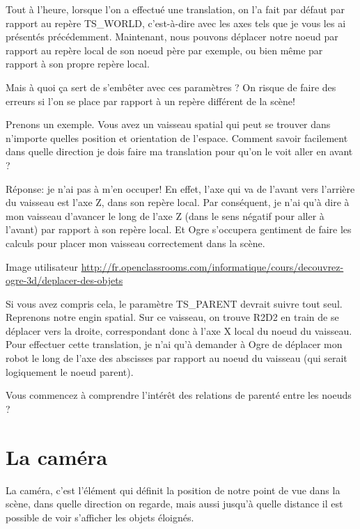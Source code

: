 Tout \`{a} l'heure, lorsque l'on a effectu\'e une translation, on l'a fait par d\'efaut par rapport au rep\`ere TS\_WORLD, c'est-\`{a}-dire avec les axes tels que je vous les ai pr\'esent\'es pr\'ec\'edemment. Maintenant, nous pouvons d\'eplacer notre noeud par rapport au rep\`ere local de son noeud p\`ere par exemple, ou bien m\^eme par rapport \`{a} son propre rep\`ere local.

Mais \`{a} quoi \c{c}a sert de s'emb\^eter avec ces param\`etres ? On risque de faire des erreurs si l'on se place par rapport \`{a} un rep\`ere diff\'erent de la sc\`ene!

Prenons un exemple. Vous avez un vaisseau spatial qui peut se trouver dans n'importe quelles position et orientation de l'espace. Comment savoir facilement dans quelle direction je dois faire ma translation pour qu'on le voit aller en avant ?

R\'eponse: je n'ai pas \`{a} m'en occuper! En effet, l'axe qui va de l'avant vers l'arri\`ere du vaisseau est l'axe Z, dans son rep\`ere local. Par cons\'equent, je n'ai qu'\`{a} dire \`{a} mon vaisseau d'avancer le long de l'axe Z (dans le sens n\'egatif pour aller \`{a} l'avant) par rapport \`{a} son rep\`ere local. Et Ogre s'occupera gentiment de faire les calculs pour placer mon vaisseau correctement dans la sc\`ene.

Image utilisateur \url{http://fr.openclassrooms.com/informatique/cours/decouvrez-ogre-3d/deplacer-des-objets}

Si vous avez compris cela, le param\`etre TS\_PARENT devrait suivre tout seul. Reprenons notre engin spatial.
Sur ce vaisseau, on trouve R2D2 en train de se d\'eplacer vers la droite, correspondant donc \`{a} l'axe X local du noeud du vaisseau. Pour effectuer cette translation, je n'ai qu'\`{a} demander \`{a} Ogre de d\'eplacer mon robot le long de l'axe des abscisses par rapport au noeud du vaisseau (qui serait logiquement le noeud parent).

Vous commencez \`{a} comprendre l'int\'er\^et des relations de parent\'e entre les noeuds ?









\section{La cam\'era}


La cam\'era, c'est l'\'el\'ement qui d\'efinit la position de notre point de vue dans la sc\`ene, dans quelle direction on regarde, mais aussi jusqu'\`{a} quelle distance il est possible de voir s'afficher les objets \'eloign\'es.

